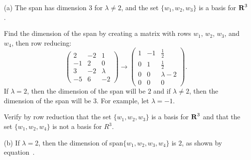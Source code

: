 (a) \ans The span has dimension $3$ for $\lambda \neq 2$, and 
the set $\{w_1,w_2,w_3\}$ is a basis for $\mbox{$\bf{R}$}^3$.

\soln Find the dimension of the span by creating a matrix with rows
$w_1$, $w_2$, $w_3$, and $w_4$, then row reducing:
\begin{equation} \label{exeq:5.6.4}
\left(\begin{array}{rrr} 2 & -2 & 1 \\ -1 & 2 & 0 \\ 3 & -2 &
\lambda \\ -5 & 6 & -2 \end{array}\right) \longrightarrow
\left(\begin{array}{rrc} 1 & -1 & \frac{1}{2} \\ 0 & 1 & \frac{1}{2}
\\ 0 & 0 & \lambda - 2 \\ 0 & 0 & 0 \end{array}\right).
\end{equation}
If $\lambda = 2$, then the dimension of the span will
be $2$ and if $\lambda \neq 2$, then the dimension of the span
will be $3$.  For example, let $\lambda = -1$.

\para Verify by row reduction that the set $\{w_1,w_2,w_3\}$ is a basis
for $\mbox{$\bf{R}$}^3$ and that the set $\{w_1,w_2,w_4\}$ is not a basis for $R^3$. 

(b) If $\lambda = 2$, then the dimension of span$\{w_1,w_2,w_3,w_4\}$
is $2$, as shown by equation~.



